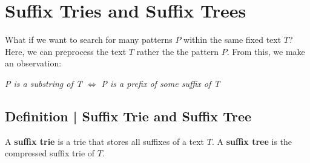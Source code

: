 \documentclass{report}
\begin{document}
\section{Suffix Tries and Suffix Trees}
What if we want to search for many patterns $P$ within the same fixed text $T$? Here, we can preprocess the text $T$ rather the the pattern $P$. From this, we make an observation:
\begin{center}
\textit{P is a substring of T $\iff$ P is a prefix of some suffix of T}
\end{center}
\subsection{Definition | Suffix Trie and Suffix Tree}
A \textbf{suffix trie} is a trie that stores all suffixes of a text $T$. A \textbf{suffix tree} is the compressed suffix trie of $T$.

\end{document}
